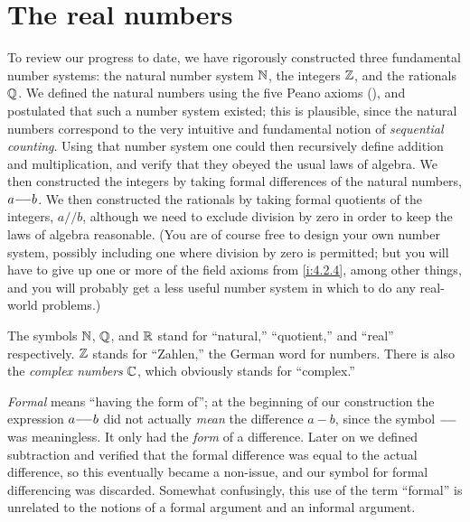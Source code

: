 \chapter{The real numbers}\label{i:ch:5}

\begin{note}
  To review our progress to date, we have rigorously constructed three fundamental number systems:
  the natural number system \(\mathbb{N}\), the integers \(\mathbb{Z}\), and the rationals \(\mathbb{Q}\).
  We defined the natural numbers using the five Peano axioms (), and postulated that such a number system existed;
  this is plausible, since the natural numbers correspond to the very intuitive and fundamental notion of \emph{sequential counting}.
  Using that number system one could then recursively define addition and multiplication, and verify that they obeyed the usual laws of algebra.
  We then constructed the integers by taking formal differences of the natural numbers, \(a {-}\!{-} b\).
  We then constructed the rationals by taking formal quotients of the integers, \(a // b\), although we need to exclude division by zero in order to keep the laws of algebra reasonable.
  (You are of course free to design your own number system, possibly including one where division by zero is permitted;
  but you will have to give up one or more of the field axioms from \cref{i:4.2.4}, among other things, and you will probably get a less useful number system in which to do any real-world problems.)
\end{note}

\begin{note}
  The symbols \(\mathbb{N}\), \(\mathbb{Q}\), and \(\mathbb{R}\) stand for ``natural,'' ``quotient,'' and ``real'' respectively.
  \(\mathbb{Z}\) stands for ``Zahlen,'' the German word for numbers.
  There is also the \emph{complex numbers} \(\mathbb{C}\), which obviously stands for ``complex.''
\end{note}

\begin{note}
  \emph{Formal} means ``having the form of'';
  at the beginning of our construction the expression \(a {-}\!{-} b\) did not actually \emph{mean} the difference \(a - b\), since the symbol \({-}\!{-}\) was meaningless.
  It only had the \emph{form} of a difference.
  Later on we defined subtraction and verified that the formal difference was equal to the actual difference, so this eventually became a non-issue, and our symbol for formal differencing was discarded.
  Somewhat confusingly, this use of the term ``formal'' is unrelated to the notions of a formal argument and an informal argument.
\end{note}

